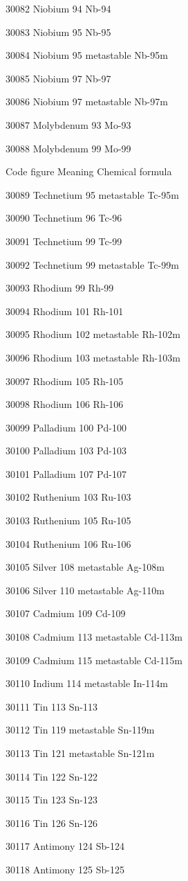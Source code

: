 30082 Niobium 94 Nb-94

30083 Niobium 95 Nb-95

30084 Niobium 95 metastable Nb-95m

30085 Niobium 97 Nb-97

30086 Niobium 97 metastable Nb-97m

30087 Molybdenum 93 Mo-93

30088 Molybdenum 99 Mo-99

Code figure Meaning Chemical formula

30089 Technetium 95 metastable Tc-95m

30090 Technetium 96 Tc-96

30091 Technetium 99 Tc-99

30092 Technetium 99 metastable Tc-99m

30093 Rhodium 99 Rh-99

30094 Rhodium 101 Rh-101

30095 Rhodium 102 metastable Rh-102m

30096 Rhodium 103 metastable Rh-103m

30097 Rhodium 105 Rh-105

30098 Rhodium 106 Rh-106

30099 Palladium 100 Pd-100

30100 Palladium 103 Pd-103

30101 Palladium 107 Pd-107

30102 Ruthenium 103 Ru-103

30103 Ruthenium 105 Ru-105

30104 Ruthenium 106 Ru-106

30105 Silver 108 metastable Ag-108m

30106 Silver 110 metastable Ag-110m

30107 Cadmium 109 Cd-109

30108 Cadmium 113 metastable Cd-113m

30109 Cadmium 115 metastable Cd-115m

30110 Indium 114 metastable In-114m

30111 Tin 113 Sn-113

30112 Tin 119 metastable Sn-119m

30113 Tin 121 metastable Sn-121m

30114 Tin 122 Sn-122

30115 Tin 123 Sn-123

30116 Tin 126 Sn-126

30117 Antimony 124 Sb-124

30118 Antimony 125 Sb-125

